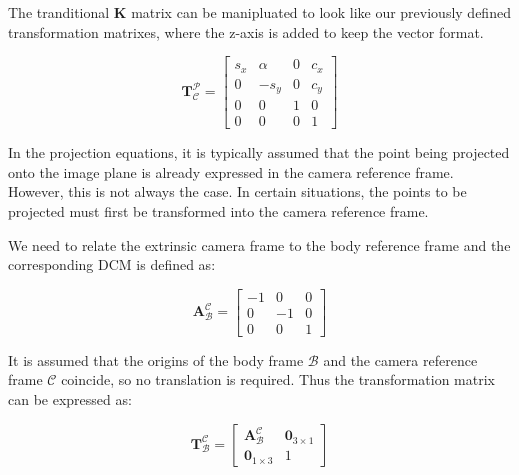 \noindent 
The tranditional $\mathbf{K}$ matrix can be manipluated to look like our previously defined transformation matrixes, where the z-axis is added to keep the vector format.

\begin{equation}
    \mathbf{T}_\mathcal{C}^\mathcal{P} = 
    \begin{bmatrix}
        s_x     & \alpha        & 0  & c_x  \\
        0       & -s_y          & 0  & c_y  \\
        0       & 0             & 1 & 0    \\
        0       & 0             & 0  & 1        
    \end{bmatrix}
\end{equation}




\noindent
In the projection equations, it is typically assumed that the point being projected onto the image plane is already expressed in the camera reference frame. 
However, this is not always the case. In certain situations, the points to be projected must first be transformed into the camera reference frame. 
\vspace{0.5cm}

\noindent
We need to relate the extrinsic camera frame to the body reference frame and the corresponding DCM is defined as:

\begin{equation}
    \mathbf{A}_\mathcal{B}^\mathcal{C} =
    \begin{bmatrix}
        -1 & 0 & 0\\
         0 & -1 & 0\\
         0 & 0 & 1
    \end{bmatrix}
\end{equation}

\noindent
It is assumed that the origins of the body frame $\mathcal{B}$ and the camera reference frame $\mathcal{C}$ coincide, so no translation is required. Thus the transformation matrix can be
expressed as:

\begin{equation}
    \mathbf{T}_\mathcal{B}^\mathcal{C} = 
    \begin{bmatrix}
        \mathbf{A}_\mathcal{B}^\mathcal{C} & \boldsymbol{0}_{3\times1} \\
        \boldsymbol{0}_{1\times3} & 1
    \end{bmatrix}
\end{equation}

